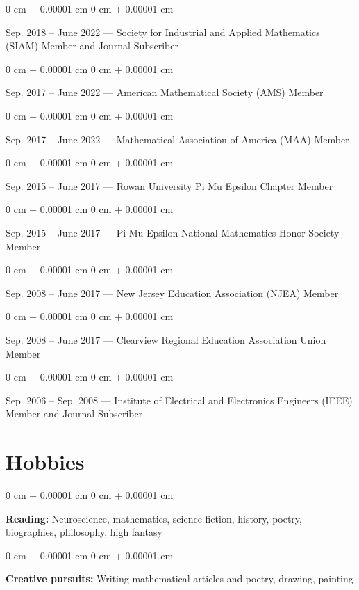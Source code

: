 \documentclass[10pt, letterpaper]{article}
\newenvironment{onecolentry}{
    \begin{adjustwidth}{
        0 cm + 0.00001 cm
    }{
        0 cm + 0.00001 cm
    }
}{
    \end{adjustwidth}
} %
\begin{document}
\begin{onecolentry}
    Sep. 2018 – June 2022 — Society for Industrial and Applied Mathematics (SIAM) Member and Journal Subscriber
\end{onecolentry}

\begin{onecolentry}
    Sep. 2017 – June 2022 — American Mathematical Society (AMS) Member
\end{onecolentry}

\begin{onecolentry}
    Sep. 2017 – June 2022 — Mathematical Association of America (MAA) Member
\end{onecolentry}

\begin{onecolentry}
    Sep. 2015 – June 2017 — Rowan University Pi Mu Epsilon Chapter Member
\end{onecolentry}

\begin{onecolentry}
    Sep. 2015 – June 2017 — Pi Mu Epsilon National Mathematics Honor Society Member
\end{onecolentry}

\begin{onecolentry}
    Sep. 2008 – June 2017 — New Jersey Education Association (NJEA) Member
\end{onecolentry}

\begin{onecolentry}
    Sep. 2008 – June 2017 — Clearview Regional Education Association Union Member
\end{onecolentry}

\begin{onecolentry}
    Sep. 2006 – Sep. 2008 — Institute of Electrical and Electronics Engineers (IEEE) Member and Journal Subscriber
\end{onecolentry}

\section{Hobbies}

\begin{onecolentry}
    \textbf{Reading:} Neuroscience, mathematics, science fiction, history, poetry, biographies, philosophy, high fantasy
\end{onecolentry}

\vspace{0.2 cm}

\begin{onecolentry}
    \textbf{Creative pursuits:} Writing mathematical articles and poetry, drawing, painting
\end{onecolentry}
\end{document}

